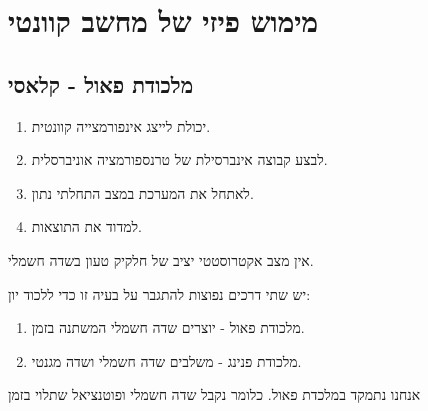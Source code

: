 \documentclass{tstextbook}
\begin{document}
\section{מימוש פיזי של מחשב קוונטי}

\subsection{מלכודת פאול - קלאסי}

\begin{reminder}
  \begin{enumerate}
    \item יכולת לייצג אינפורמצייה קוונטית. 


    \item לבצע קבוצה אינברסילת של טרנספורמציה אוניברסלית. 


    \item לאתחל את המערכת במצב התחלתי נתון. 


    \item למדוד את התוצאות. 


  \end{enumerate}
\end{reminder}
\begin{reminder}
אין מצב אקטרוסטטי יציב של חלקיק טעון בשדה חשמלי.

\end{reminder}
\begin{proposition}
יש שתי דרכים נפוצות להתגבר על בעיה זו כדי ללכוד יון:

  \begin{enumerate}
    \item מלכודת פאול - יוצרים שדה חשמלי המשתנה בזמן. 


    \item מלכודת פנינג - משלבים שדה חשמלי ושדה מגנטי. 


  \end{enumerate}
\end{proposition}
אנחנו נתמקד במלכדת פאול. כלומר נקבל שדה חשמלי ופוטנציאל שתלוי בזמן
\end{document}
